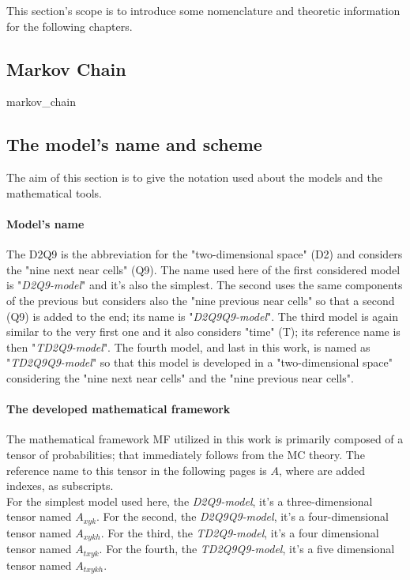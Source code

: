 \documentclass[class=article, crop=false]{standalone}
\begin{document}
This section's scope is to introduce some nomenclature and theoretic information for the following chapters.


\subsection{Markov Chain} %
	{markov_chain}
	

\FloatBarrier
\subsection{The model's name and scheme}
The aim of this section is to give the notation used about the models and the mathematical tools.


\paragraph{Model's name} 
The D2Q9 is the abbreviation for the "two-dimensional space" (D2) and considers the "nine next near cells" (Q9).
The name used here of the first considered model is "\emph{D2Q9-model}" and it's also the simplest.
The second uses the same components of the previous but considers also the "nine previous near cells" so that a second (Q9) is added to the end; its name is "\emph{D2Q9Q9-model}".
The third model is again similar to the very first one and it also considers "time" (T); its reference name is then "\emph{TD2Q9-model}".
The fourth model, and last in this work, is named as "\emph{TD2Q9Q9-model}" so that this model is developed in a "two-dimensional space" considering the "nine next near cells" and the "nine previous near cells".


\paragraph{The developed mathematical framework}
The mathematical framework MF utilized in this work is primarily composed of a tensor of probabilities; that immediately follows from the MC theory.
The reference name to this tensor in the following pages is $A$, where are added indexes, as subscripts.
\\For the simplest model used here, the \emph{D2Q9-model}, it's a three-dimensional tensor named $A_{x y k}$.
For the second, the \emph{D2Q9Q9-model}, it's a four-dimensional tensor named $A_{x y k h}$.
For the third, the \emph{TD2Q9-model}, it's a four dimensional tensor named $A_{t x y k}$.
For the fourth, the \emph{TD2Q9Q9-model}, it's a five dimensional tensor named $A_{t x y k h}$.
\end{document}
